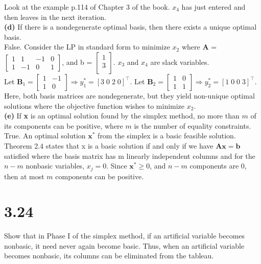 \documentclass{article}
\begin{document}
\noindent
Look at the example p.114 of Chapter 3 of the book.  $x_4$ has just entered and then leaves in the next iteration.\\

\noindent
\textbf{(d)} If there is a nondegenerate optimal basis, then there exists a unique optimal basis.\\

\noindent
False.  
Consider the LP in standard form to minimize $x_2$ where \textbf{A} = $\begin{bmatrix}
1 & 1 & -1 & 0\\
1 & -1 & 0 & 1
\end{bmatrix}$,
and b = $\begin{bmatrix}
1 \\
3 \\
\end{bmatrix}$.  $x_3$ and $x_4$ are slack variables. \vspace{1mm}  \\
Let $\mathbf{B}_1 = 
\begin{bmatrix}
1 & -1  \\
1 & 0
\end{bmatrix} \Rightarrow y^*_1 = [3 \; 0 \;  2 \; 0]^\top.$ Let $\mathbf{B}_2 = 
\begin{bmatrix}
1 & 0  \\
1 & 1
\end{bmatrix} \Rightarrow y^*_2 = [1 \; 0 \; 0 \; 3]^\top.$ \\

\noindent Here, both basis matrices are nondegenerate, but they yield non-unique optimal solutions where the objective function wishes to minimize $x_2$.\\


\noindent
\textbf{(e)} If \textbf{x} is an optimal solution found by the simplex method, no more than $m$ of its components can be positive, where $m$ is the number of equality constraints.\\

\noindent
True.  An optimal solution $\mathbf{x^*}$ from the simplex is a basic feasible solution.  Theorem 2.4 states that x is a basic solution if and only if we have $\mathbf{Ax=b}$ satisfied where the basis matrix has m linearly independent columns and for the $n-m$ nonbasic variables, $x_j = 0$.  Since $\mathbf{x^*} \geq 0$, and $n-m$ components are 0, then at most $m$ components can be positive. \\

\section*{3.24}
\noindent
Show that in Phase I of the simplex method, if an artificial variable becomes nonbasic, it need never again become basic.  Thus, when an artificial variable becomes nonbasic, its columns can be eliminated from the tableau.\\
\end{document}

